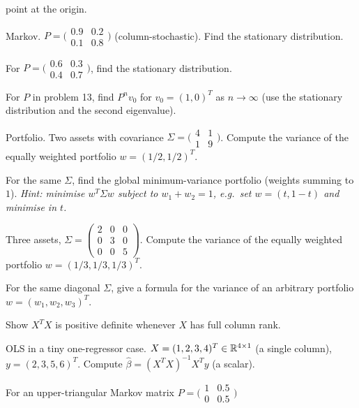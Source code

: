 \begin{problems}
        point at the origin.
  \item Markov.
        $P = \bigl(\begin{smallmatrix} 0.9 & 0.2 \\ 0.1 & 0.8 \end{smallmatrix}\bigr)$
        (column-stochastic). Find the stationary distribution.
  \item For
        $P = \bigl(\begin{smallmatrix} 0.6 & 0.3 \\ 0.4 & 0.7 \end{smallmatrix}\bigr)$,
        find the stationary distribution.
  \item For $P$ in problem 13, find $P^{n} v_{0}$ for $v_{0} = (1, 0)^{T}$
        as $n \to \infty$ (use the stationary distribution and the second
        eigenvalue).
  \item Portfolio. Two assets with covariance
        $\Sigma = \bigl(\begin{smallmatrix} 4 & 1 \\ 1 & 9 \end{smallmatrix}\bigr)$.
        Compute the variance of the equally weighted portfolio
        $w = (1/2, 1/2)^{T}$.
  \item For the same $\Sigma$, find the global minimum-variance portfolio
        (weights summing to $1$). \emph{Hint: minimise $w^{T} \Sigma w$
        subject to $w_{1} + w_{2} = 1$, e.g.\ set $w = (t, 1 - t)$ and
        minimise in $t$.}
  \item Three assets,
        $\Sigma = \begin{pmatrix} 2 & 0 & 0 \\ 0 & 3 & 0 \\ 0 & 0 & 5 \end{pmatrix}$.
        Compute the variance of the equally weighted portfolio
        $w = (1/3, 1/3, 1/3)^{T}$.
  \item For the same diagonal $\Sigma$, give a formula for the variance of
        an arbitrary portfolio $w = (w_{1}, w_{2}, w_{3})^{T}$.
  \item Show $X^{T} X$ is positive definite whenever $X$ has full column
        rank.
  \item OLS in a tiny one-regressor case.
        $X = (1, 2, 3, 4)^{T} \in \mathbb{R}^{4 \times 1}$ (a single column),
        $y = (2, 3, 5, 6)^{T}$. Compute
        $\hat{\beta} = (X^{T} X)^{-1} X^{T} y$ (a scalar).
  \item For an upper-triangular Markov matrix
        $P = \bigl(\begin{smallmatrix} 1 & 0.5 \\ 0 & 0.5 \end{smallmatrix}\bigr)$

\end{problems}
